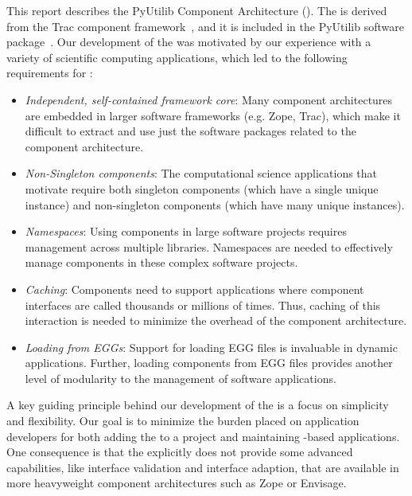 This report describes the PyUtilib Component Architecture (\pca).  The \pcasp
is derived from the Trac component framework~\cite{Trac}, and it is included
in the PyUtilib software package~\cite{PyUtilib}.  Our development of the \pcasp was motivated by our experience with a variety of scientific computing applications, which led to the following requirements for \pca:
\begin{itemize}

\item \textit{Independent, self-contained framework core}: Many
  component architectures 
are embedded in larger software frameworks (e.g. Zope, Trac), which
  make it difficult 
to extract and use just the software packages related to the component
architecture.  

\item \textit{Non-Singleton components}:  The computational science
applications that motivate \pcasp require both singleton components
(which have a single unique instance) and non-singleton components
(which have many unique instances). 

\item \textit{Namespaces}:  Using components in large software projects
requires management across multiple libraries.  Namespaces are needed
to effectively manage components in these complex software projects.

\item \textit{Caching}:  Components need to support applications
where component interfaces are called thousands or millions of times.
Thus, caching of this 
interaction 
is needed to minimize the overhead of the component architecture.

\item \textit{Loading from EGGs}:  Support for loading EGG files is
invaluable in dynamic applications.  Further, loading components from EGG
files provides another level of modularity to the management of software
applications.

\end{itemize}

A key guiding principle behind our development of the \pcasp is a focus on
simplicity and flexibility.  Our goal is to minimize the burden placed
on application developers for both adding the \pcasp to a project and
maintaining \pca-based applications.  One consequence is that the \pcasp
explicitly does not provide some advanced capabilities, like interface
validation and interface adaption, that are available in more
heavyweight component architectures such as Zope or Envisage.


